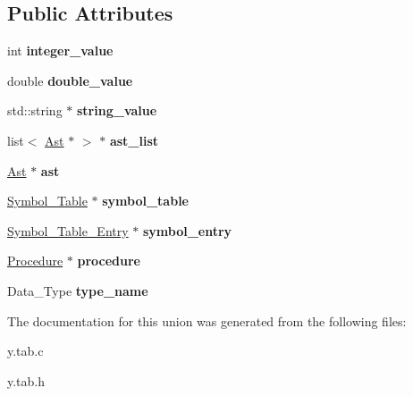 \subsection*{Public Attributes}
\begin{DoxyCompactItemize}
\item 
\mbox{\label{unionYYSTYPE_a028cbada19c50bef6d847745f6ac77ca}} 
int {\bfseries integer\+\_\+value}
\item 
\mbox{\label{unionYYSTYPE_aa6870dc4e9041e4809c308d7e584254b}} 
double {\bfseries double\+\_\+value}
\item 
\mbox{\label{unionYYSTYPE_a33791461deb0564fc55535b1541cb749}} 
std\+::string $\ast$ {\bfseries string\+\_\+value}
\item 
\mbox{\label{unionYYSTYPE_ae5f0014c9b898eec5bc2ff36c045536c}} 
list$<$ \hyperlink{classAst}{Ast} $\ast$ $>$ $\ast$ {\bfseries ast\+\_\+list}
\item 
\mbox{\label{unionYYSTYPE_a9981232ac9b10137cb5dc5d4e6d659a5}} 
\hyperlink{classAst}{Ast} $\ast$ {\bfseries ast}
\item 
\mbox{\label{unionYYSTYPE_ab9f2308aa7c6c0422cdc5610ebdec97f}} 
\hyperlink{classSymbol__Table}{Symbol\+\_\+\+Table} $\ast$ {\bfseries symbol\+\_\+table}
\item 
\mbox{\label{unionYYSTYPE_ab383d53c10df31a7900b81fdc3f1aaa4}} 
\hyperlink{classSymbol__Table__Entry}{Symbol\+\_\+\+Table\+\_\+\+Entry} $\ast$ {\bfseries symbol\+\_\+entry}
\item 
\mbox{\label{unionYYSTYPE_af462b584ebdaa89880aafa35b284a43f}} 
\hyperlink{classProcedure}{Procedure} $\ast$ {\bfseries procedure}
\item 
\mbox{\label{unionYYSTYPE_a3aa040f2e6cf64c0aeb0d38af5098a98}} 
Data\+\_\+\+Type {\bfseries type\+\_\+name}
\end{DoxyCompactItemize}


The documentation for this union was generated from the following files\+:\begin{DoxyCompactItemize}
\item 
y.\+tab.\+c\item 
y.\+tab.\+h\end{DoxyCompactItemize}
